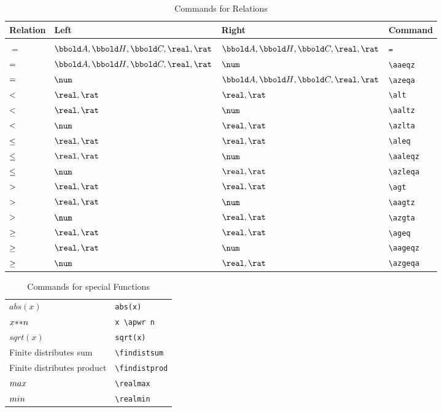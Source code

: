 \documentclass[12pt]{article}
\begin{document}
\begin{table}[htbp]
  \centering
  \begin{tabular}{llll}
    Relation & Left & Right & Command \\
    \hline \\
    $=$ & $\arithmos, \quaternions, \complex, \real, \rat$ & $\arithmos, \quaternions, \complex, \real, \rat$ & \verb|=| \\
    $=$ & $\arithmos, \quaternions, \complex, \real, \rat$ & $\num$ & \verb|\aaeqz| \\
    $=$ & $\num$ & $\arithmos, \quaternions, \complex, \real, \rat$ & \verb|\azeqa| \\
    $<$ & $\real, \rat$ & $\real, \rat$ & \verb|\alt| \\
    $<$ & $\real, \rat$ & $\num$ & \verb|\aaltz| \\
    $<$ & $\num$ & $\real, \rat$ & \verb|\azlta| \\
    $\leq$ & $\real, \rat$ & $\real, \rat$ & \verb|\aleq| \\
    $\leq$ & $\real, \rat$ & $\num$ & \verb|\aaleqz| \\
    $\leq$ & $\num$ & $\real, \rat$ & \verb|\azleqa| \\
    $>$ & $\real, \rat$ & $\real, \rat$ & \verb|\agt| \\
    $>$ & $\real, \rat$ & $\num$ & \verb|\aagtz| \\
    $>$ & $\num$ & $\real, \rat$ & \verb|\azgta| \\
    $\geq$ & $\real, \rat$ & $\real, \rat$ & \verb|\ageq| \\
    $\geq$ & $\real, \rat$ & $\num$ & \verb|\aageqz| \\
    $\geq$ & $\num$ & $\real, \rat$ & \verb|\azgeqa| \\
    \hline
  \end{tabular}
  \caption{Commands for Relations}
  \label{tab:latex-relations}
\end{table}
%
\begin{table}[htbp]
  \centering
  \begin{tabular}{ll}
    $abs(x)$    & \verb|abs(x)| \\
    $x {*}{*} n$    & \verb|x \apwr n| \\
    $sqrt(x)$    & \verb|sqrt(x)| \\
    Finite distributes sum & \verb|\findistsum| \\
    Finite distributes product & \verb|\findistprod| \\
    $max$ & \verb|\realmax| \\
    $min$ & \verb|\realmin| \\
  \end{tabular}
  \caption{Commands for special Functions}
  \label{tab:latex-special-functions}
\end{table}
\end{document}
